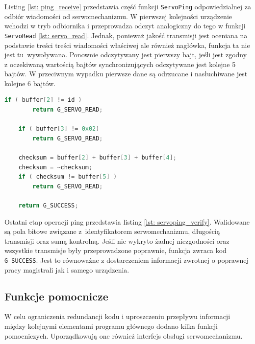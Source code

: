 Listing \ref{lst: ping_receive} przedstawia część funkcji \texttt{ServoPing} odpowiedzialnej za odbiór wiadomości od serwomechanizmu. W pierwszej kolejności urządzenie wchodzi w tryb odbiornika i przeprowadza odczyt analogiczny do tego w funkcji \texttt{ServoRead} \ref{lst: servo_read}. Jednak, ponieważ jakość transmisji jest oceniana na podstawie treści treści wiadomości właściwej ale również nagłówka, funkcja ta nie jest tu~wywoływana. Ponownie odczytywany jest pierwszy bajt, jeśli jest zgodny z oczekiwaną wartością bajtów synchronizujących odczytywane jest kolejne 5 bajtów. W przeciwnym wypadku pierwsze dane są odrzucane i nasłuchiwane jest kolejne 6 bajtów. 
\begin{lstlisting}[language=C,
    caption={Weryfikacja wiadomości ping},
    label={lst: servoping_verify}]
    if ( buffer[2] != id )
        return G_SERVO_READ;
    
    if ( buffer[3] != 0x02)
        return G_SERVO_READ;
    
    checksum = buffer[2] + buffer[3] + buffer[4];
    checksum = ~checksum;
    if ( checksum != buffer[5] )
        return G_SERVO_READ;
    
    return G_SUCCESS;
\end{lstlisting}
Ostatni etap operacji ping przedstawia listing \ref{lst: servoping_verify}. Walidowane są pola bitowe związane z~identyfikatorem serwomechanizmu, długością transmisji oraz sumą kontrolną. Jeśli nie wykryto żadnej niezgodności oraz wszystkie transmisje były przeprowadzone poprawnie, funkcja zwraca kod \texttt{G\_SUCCESS}. Jest to równoważne z dostarczeniem informacji zwrotnej o poprawnej pracy magistrali jak i samego urządzenia.

\subsection{Funkcje pomocnicze}
W celu ograniczenia redundancji kodu i uproszczeniu przepływu informacji między kolejnymi elementami programu głównego dodano kilka funkcji pomocniczych. Uporządkowują one również interfejs obsługi serwomechanizmu. 

